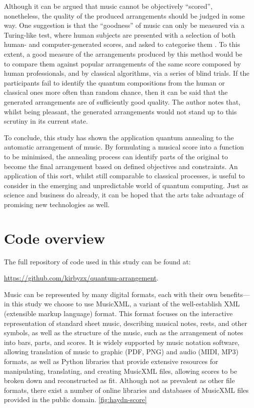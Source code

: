 \documentclass[12pt]{article}
\theoremstyle{definition}
\begin{document}
Although it can be argued that music cannot be objectively ``scored'', nonetheless, the quality of the produced arrangements should be judged in some way. One suggestion is that the ``goodness'' of music can only be measured via a Turing-like test, where human subjects are presented with a selection of both human- and computer-generated scores, and asked to categorise them \cite{pearce_towards_2001}. To this extent, a good measure of the arrangements produced by this method would be to compare them against popular arrangements of the same score composed by human professionals, and by classical algorithms, via a series of blind trials. If the participants fail to identify the quantum compositions from the human or classical ones more often than random chance, then it can be said that the generated arrangements are of sufficiently good quality. The author notes that, whilst being pleasant, the generated arrangements would not stand up to this scrutiny in its current state.

To conclude, this study has shown the application quantum annealing to the automatic arrangement of music. By formulating a musical score into a function to be minimised, the annealing process can identify parts of the original to become the final arrangement based on defined objectives and constraints. An application of this sort, whilst still comparable to classical processes, is useful to consider in the emerging and unpredictable world of quantum computing. Just as science and business do already, it can be hoped that the arts take advantage of promising new technologies as well.

\begin{singlespace*}
    \printbibliography[heading=bibintoc]
\end{singlespace*}

\clearpage
\appendix
\setcounter{figure}{0}

\section{Code overview}
\label{app:code}

The full repository of code used in this study can be found at:

\url{https://github.com/kirbyzx/quantum-arrangement}.

Music can be represented by many digital formats, each with their own benefits---in this study we choose to use MusicXML, a variant of the well-establish XML (extensible markup language) format. This format focuses on the interactive representation of standard sheet music, describing musical notes, rests, and other symbols, as well as the structure of the music, such as the arrangement of notes into bars, parts, and scores. It is widely supported by music notation software, allowing translation of music to graphic (PDF, PNG) and audio (MIDI, MP3) formats, as well as Python libraries that provide extensive resources for manipulating, translating, and creating MusicXML files, allowing scores to be broken down and reconstructed as fit. Although not as prevalent as other file formats, there exist a number of online libraries and databases of MusicXML files provided in the public domain. \cref{fig:haydn-score}
\end{document}
